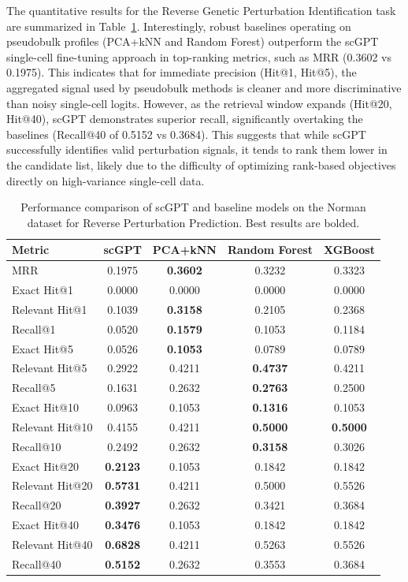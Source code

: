 \documentclass{article}
\begin{document}
The quantitative results for the Reverse Genetic Perturbation Identification task are summarized in Table~\ref{tab:reverse_prediction_results}. Interestingly, robust baselines operating on pseudobulk profiles (PCA+kNN and Random Forest) outperform the scGPT single-cell fine-tuning approach in top-ranking metrics, such as MRR (0.3602 vs 0.1975). This indicates that for immediate precision (Hit@1, Hit@5), the aggregated signal used by pseudobulk methods is cleaner and more discriminative than noisy single-cell logits. However, as the retrieval window expands (Hit@20, Hit@40), scGPT demonstrates superior recall, significantly overtaking the baselines (Recall@40 of 0.5152 vs 0.3684). This suggests that while scGPT successfully identifies valid perturbation signals, it tends to rank them lower in the candidate list, likely due to the difficulty of optimizing rank-based objectives directly on high-variance single-cell data.

\begin{table}[h]
\caption{Performance comparison of scGPT and baseline models on the Norman dataset for Reverse Perturbation Prediction. Best results are bolded.}
\label{tab:reverse_prediction_results}
\centering
\begin{tabular}{lcccc}
\hline
Metric & scGPT & PCA+kNN & Random Forest & XGBoost \\
\hline
MRR & 0.1975 & \textbf{0.3602} & 0.3232 & 0.3323 \\
Exact Hit@1 & 0.0000 & 0.0000 & 0.0000 & 0.0000 \\
Relevant Hit@1 & 0.1039 & \textbf{0.3158} & 0.2105 & 0.2368 \\
Recall@1 & 0.0520 & \textbf{0.1579} & 0.1053 & 0.1184 \\
Exact Hit@5 & 0.0526 & \textbf{0.1053} & 0.0789 & 0.0789 \\
Relevant Hit@5 & 0.2922 & 0.4211 & \textbf{0.4737} & 0.4211 \\
Recall@5 & 0.1631 & 0.2632 & \textbf{0.2763} & 0.2500 \\
Exact Hit@10 & 0.0963 & 0.1053 & \textbf{0.1316} & 0.1053 \\
Relevant Hit@10 & 0.4155 & 0.4211 & \textbf{0.5000} & \textbf{0.5000} \\
Recall@10 & 0.2492 & 0.2632 & \textbf{0.3158} & 0.3026 \\
Exact Hit@20 & \textbf{0.2123} & 0.1053 & 0.1842 & 0.1842 \\
Relevant Hit@20 & \textbf{0.5731} & 0.4211 & 0.5000 & 0.5526 \\
Recall@20 & \textbf{0.3927} & 0.2632 & 0.3421 & 0.3684 \\
Exact Hit@40 & \textbf{0.3476} & 0.1053 & 0.1842 & 0.1842 \\
Relevant Hit@40 & \textbf{0.6828} & 0.4211 & 0.5263 & 0.5526 \\
Recall@40 & \textbf{0.5152} & 0.2632 & 0.3553 & 0.3684 \\
\hline
\end{tabular}
\end{table}
\end{document}
